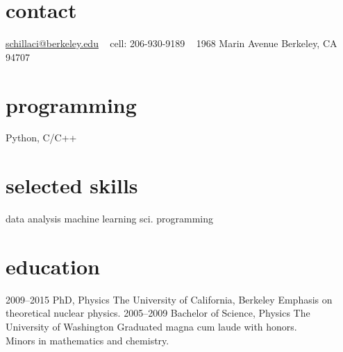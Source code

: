 \documentclass[]{friggeri-cv} %
\begin{document}


\begin{aside} %
\section{contact}
\href{mailto:schillaci@berkeley.edu}{schillaci@berkeley.edu}
~
cell: 206-930-9189
~
1968 Marin Avenue
Berkeley, CA 94707
\section{programming}
Python, C/C++
\section{selected skills}
data analysis
machine learning
sci. programming
\end{aside}


\section{education}

\begin{entrylist}
\entry
{2009--2015}
{PhD, {\normalfont  Physics}}
{The University of California, Berkeley}
{Emphasis on theoretical nuclear physics.}
\entry
{2005--2009}
{Bachelor of Science, {\normalfont Physics}}
{The University of Washington}
{Graduated magna cum laude with honors.\\ Minors in mathematics and chemistry.}
\end{entrylist}

\end{document}

